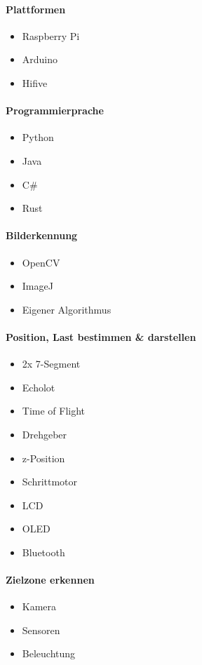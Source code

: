 \documentclass[a4paper]{report}
\begin{document}
\begin{multicols}{2}
\paragraph{Plattformen}
\begin{itemize}[noitemsep]
	\item Raspberry Pi
	\item Arduino
	\item Hifive
\end{itemize}

\paragraph{Programmierprache}
\begin{itemize}[noitemsep]
	\item Python
	\item Java
	\item C\#
	\item Rust
\end{itemize}

\paragraph{Bilderkennung}
\begin{itemize}[noitemsep]
	\item OpenCV
	\item ImageJ
	\item Eigener Algorithmus
\end{itemize}

\paragraph{Position, Last bestimmen \& darstellen}
\begin{itemize}[noitemsep]
	\item 2x 7-Segment
	\item Echolot
	\item Time of Flight
	\item Drehgeber
	\item z-Position
	\item Schrittmotor
	\item LCD
	\item OLED
	\item Bluetooth
\end{itemize}

\paragraph{Zielzone erkennen}
\begin{itemize}[noitemsep]
	\item Kamera
	\item Sensoren
	\item Beleuchtung
\end{itemize}


\end{multicols}
\end{document}
